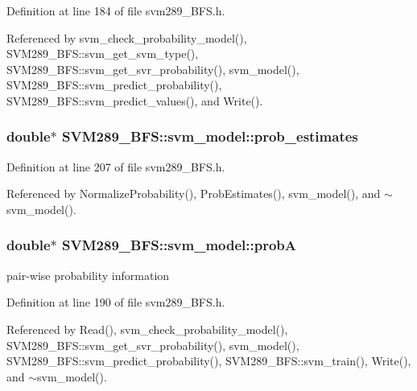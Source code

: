 Definition at line 184 of file svm289\+\_\+\+B\+F\+S.\+h.



Referenced by svm\+\_\+check\+\_\+probability\+\_\+model(), S\+V\+M289\+\_\+\+B\+F\+S\+::svm\+\_\+get\+\_\+svm\+\_\+type(), S\+V\+M289\+\_\+\+B\+F\+S\+::svm\+\_\+get\+\_\+svr\+\_\+probability(), svm\+\_\+model(), S\+V\+M289\+\_\+\+B\+F\+S\+::svm\+\_\+predict\+\_\+probability(), S\+V\+M289\+\_\+\+B\+F\+S\+::svm\+\_\+predict\+\_\+values(), and Write().

\subsubsection[{\texorpdfstring{prob\+\_\+estimates}{prob_estimates}}]{\setlength{\rightskip}{0pt plus 5cm}double$\ast$ S\+V\+M289\+\_\+\+B\+F\+S\+::svm\+\_\+model\+::prob\+\_\+estimates}\hypertarget{struct_s_v_m289___b_f_s_1_1svm__model_a8bb5f40004d6d6e4ce39b299111f00cf}{}\label{struct_s_v_m289___b_f_s_1_1svm__model_a8bb5f40004d6d6e4ce39b299111f00cf}


Definition at line 207 of file svm289\+\_\+\+B\+F\+S.\+h.



Referenced by Normalize\+Probability(), Prob\+Estimates(), svm\+\_\+model(), and $\sim$svm\+\_\+model().

\subsubsection[{\texorpdfstring{probA}{probA}}]{\setlength{\rightskip}{0pt plus 5cm}double$\ast$ S\+V\+M289\+\_\+\+B\+F\+S\+::svm\+\_\+model\+::probA}\hypertarget{struct_s_v_m289___b_f_s_1_1svm__model_a5626ef4775f7837e09dec0e2b163085b}{}\label{struct_s_v_m289___b_f_s_1_1svm__model_a5626ef4775f7837e09dec0e2b163085b}
pair-\/wise probability information 

Definition at line 190 of file svm289\+\_\+\+B\+F\+S.\+h.



Referenced by Read(), svm\+\_\+check\+\_\+probability\+\_\+model(), S\+V\+M289\+\_\+\+B\+F\+S\+::svm\+\_\+get\+\_\+svr\+\_\+probability(), svm\+\_\+model(), S\+V\+M289\+\_\+\+B\+F\+S\+::svm\+\_\+predict\+\_\+probability(), S\+V\+M289\+\_\+\+B\+F\+S\+::svm\+\_\+train(), Write(), and $\sim$svm\+\_\+model().

